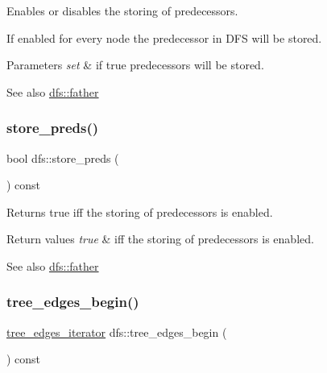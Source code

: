 Enables or disables the storing of predecessors. 

If enabled for every node the predecessor in D\+FS will be stored.


\begin{DoxyParams}{Parameters}
{\em set} & if true predecessors will be stored. \\
\hline
\end{DoxyParams}
\begin{DoxySeeAlso}{See also}
\mbox{\hyperlink{classdfs_a3012717ce541b3e56943e2c2c50efdf6}{dfs\+::father}} 
\end{DoxySeeAlso}
\mbox{\label{classdfs_ad0233128f2958d630102096aa6f3b9ef}} 
\subsubsection{\texorpdfstring{store\+\_\+preds()}{store\_preds()}\hspace{0.1cm}{\footnotesize\ttfamily [2/2]}}
{\footnotesize\ttfamily bool dfs\+::store\+\_\+preds (\begin{DoxyParamCaption}{ }\end{DoxyParamCaption}) const\hspace{0.3cm}{\ttfamily [inline]}}



Returns true iff the storing of predecessors is enabled. 


\begin{DoxyRetVals}{Return values}
{\em true} & iff the storing of predecessors is enabled. \\
\hline
\end{DoxyRetVals}
\begin{DoxySeeAlso}{See also}
\mbox{\hyperlink{classdfs_a3012717ce541b3e56943e2c2c50efdf6}{dfs\+::father}} 
\end{DoxySeeAlso}
\mbox{\label{classdfs_afe193938a05b114870c19163731273c8}} 
\subsubsection{\texorpdfstring{tree\+\_\+edges\+\_\+begin()}{tree\_edges\_begin()}}
{\footnotesize\ttfamily \mbox{\hyperlink{classdfs_a0eee0ddec5343c05f617d6d7aabb6d19}{tree\+\_\+edges\+\_\+iterator}} dfs\+::tree\+\_\+edges\+\_\+begin (\begin{DoxyParamCaption}{ }\end{DoxyParamCaption}) const\hspace{0.3cm}{\ttfamily [inline]}}



